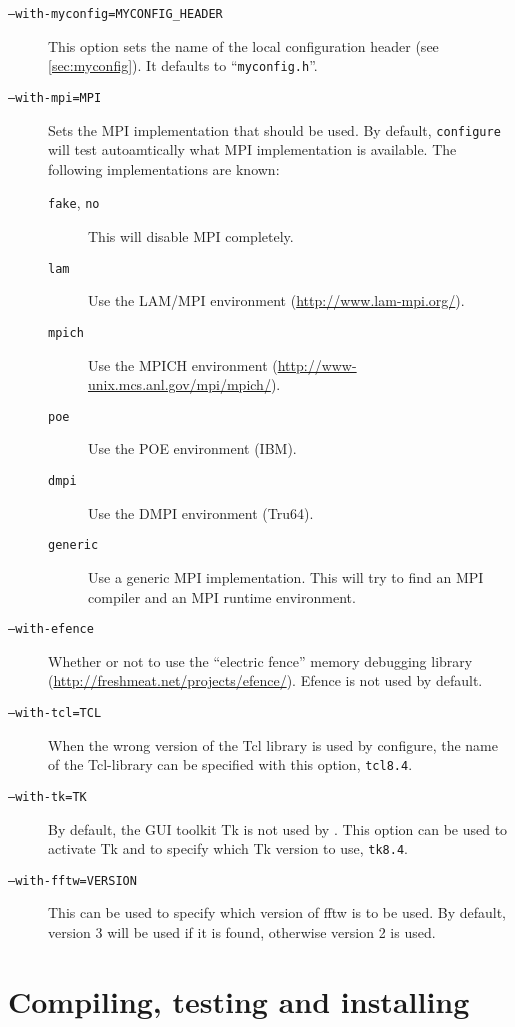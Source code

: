 \begin{description}
\item[\texttt{--with-myconfig=MYCONFIG\_HEADER}] This option sets the
  name of the local configuration header (see \vref{sec:myconfig}). It
  defaults to ``\texttt{myconfig.h}''.
\item[\texttt{--with-mpi=MPI}] Sets the MPI implementation that should
  be used. By default, \texttt{configure} will test autoamtically what
  MPI implementation is available. The following implementations are
  known: 
  \begin{description}
  \item[\texttt{fake}, \texttt{no}] This will disable MPI completely.
  \item[\texttt{lam}] Use the LAM/MPI environment
    (\url{http://www.lam-mpi.org/}).
  \item[\texttt{mpich}] Use the MPICH environment
    (\url{http://www-unix.mcs.anl.gov/mpi/mpich/}).
  \item[\texttt{poe}] Use the POE environment (IBM).
  \item[\texttt{dmpi}] Use the DMPI environment (Tru64).
  \item[\texttt{generic}] Use a generic MPI implementation. This will
    try to find an MPI compiler and an MPI runtime environment.
  \end{description}
\item[\texttt{--with-efence}] Whether or not to use the ``electric
  fence'' memory debugging library
  (\url{http://freshmeat.net/projects/efence/}). Efence is not used by
  default.
\item[\texttt{--with-tcl=TCL}] When the wrong version of the Tcl
  library is used by configure, the name of the Tcl-library can be
  specified with this option, \eg{} \texttt{tcl8.4}.
\item[\texttt{--with-tk=TK}] By default, the GUI toolkit Tk is not
  used by \es. This option can be used to activate Tk and to specify
  which Tk version to use, \eg{} \texttt{tk8.4}.
\item[\texttt{--with-fftw=VERSION}] This can be used to specify which
  version of fftw is to be used. By default, version 3 will be used if
  it is found, otherwise version 2 is used.
\end{description}

\section{Compiling, testing and installing \es}
\label{sec:make}

